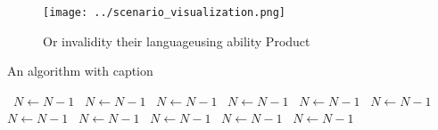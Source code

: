 \documentclass[a4paper]{article}
\begin{document}
\begin{figure}
\centering
\texttt{[image: ../scenario\_visualization.png]}
\caption{Or invalidity their languageusing ability Product
}
\end{figure}
 
\begin{algorithm}
\caption{An algorithm with caption}
\begin{algorithmic}
\    \State $N \gets N - 1$
\    \State $N \gets N - 1$
\    \State $N \gets N - 1$
\    \State $N \gets N - 1$
\    \State $N \gets N - 1$
\    \State $N \gets N - 1$
\    \State $N \gets N - 1$
\    \State $N \gets N - 1$
\    \State $N \gets N - 1$
\    \State $N \gets N - 1$
\    \State $N \gets N - 1$
\EndWhile
\end{algorithmic}
\end{algorithm}
\end{document}

